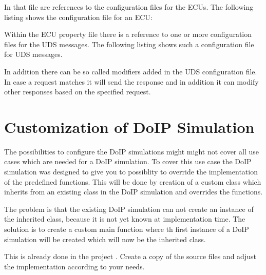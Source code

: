 \documentclass[a4paper]{doipdoc}
\begin{document}
		

		In that file are references to the configuration files for the ECUs.
		The following listing shows the configuration file for an ECU:

		

		Within the ECU property file there is a reference to one or more
		configuration files for the UDS messages. The following listing 
		shows such a configuration file for UDS messages.

		

		In addition there can be so called modifiers added in the UDS configuration
		file. In case a request matches it will send the response and in addition
		it can modify other responses based on the specified request.

		

\section{Customization of DoIP Simulation}

		The possibilities to configure the DoIP simulations might might not
		cover all use cases which are needed for a DoIP simulation. To
		cover this use case the DoIP simulation was designed to give you
		to possiblity to override the implementation of the predefined
		functions. This will be done by creation of a custom class which
		inherits from an existing class in the DoIP simulation and overrides
		the functions.

		The problem is that the existing DoIP simulation can not create
		an instance of the inherited class, because it is not yet known 
		at implementation time. The solution is to create a custom
		main function where th first instance of a DoIP simulation will 
		be created which will now be the inherited class. 

		This is already done in the project .
		Create a copy of the source files and adjust the implementation
		according to your needs.
		
\end{document}
